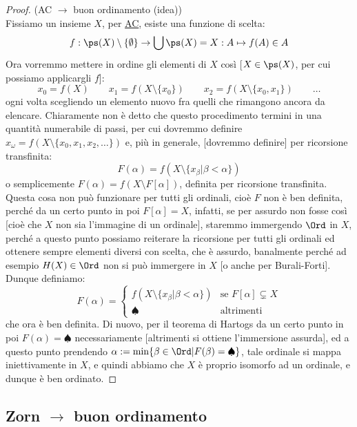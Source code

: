 \documentclass[11pt]{scrartcl}
\begin{document}
\begin{proof}
	(AC $\rightarrow$ buon ordinamento (idea))\\
	Fissiamo un insieme $X$, per \hyperref[ax9]{AC}, esiste una funzione di scelta:
	\[ f : \ps(X) \setminus\{\emptyset\} \rightarrow \bigcup \ps(X) = X : A \mapsto f(A) \in A
		\]
	Ora vorremmo mettere in ordine gli elementi di $X$ così [$X \in \ps(X)$, per cui possiamo applicargli $f$]:
	\[ x_0 = f(X) \qquad x_1 = f(X \setminus \{x_0\}) \qquad x_2 = f(X \setminus \{x_0,x_1\}) \qquad\ldots
		\]
	ogni volta scegliendo un elemento nuovo fra quelli che rimangono ancora da elencare. Chiaramente non è detto che questo procedimento termini
	in una quantità numerabile di passi, per cui dovremmo definire $x_\omega = f(X\setminus\{x_0,x_1,x_2,\ldots\})$ e, più in generale, [dovremmo definire] per ricorsione transfinita:
	\[ F(\alpha) = f(X \setminus\{x_\beta | \beta < \alpha\})
		\]
	o semplicemente $F(\alpha) = f(X \setminus F[\alpha])$, definita per ricorsione transfinita. Questa cosa non può funzionare per tutti gli ordinali, cioè $F$ non è ben definita, perché da un certo punto in poi $F[\alpha] = X$, infatti, se per assurdo non fosse così [cioè che $X$ non sia l'immagine di un ordinale],
	staremmo immergendo $\Ord$ in $X$, perché a questo punto possiamo reiterare la ricorsione per tutti gli ordinali ed ottenere sempre elementi diversi con scelta, che è assurdo, banalmente perché ad esempio $H(X) \in \Ord$ non si può immergere in $X$ [o anche per Burali-Forti]. Dunque definiamo:
	\[ F(\alpha) = \begin{cases}
		f(X \setminus\{x_\beta | \beta < \alpha\}) &\text{se $F[\alpha] \subsetneq X$} \\
		\spadesuit &\text{altrimenti}
	\end{cases}
		\] 
	che ora è ben definita. Di nuovo, per il teorema di Hartogs da un certo punto in poi $F(\alpha) = \spadesuit$ necessariamente [altrimenti si ottiene l'immersione assurda], ed a questo punto prendendo $\alpha := \min \{\beta \in \Ord | F(\beta) = \spadesuit\}$, tale ordinale si mappa iniettivamente in $X$, e quindi abbiamo che $X$
	è proprio isomorfo ad un ordinale, e dunque è ben ordinato.
\end{proof}

\subsection{\texorpdfstring{Zorn $\rightarrow$ buon ordinamento}{Zorn implica buon ordinamento}}
\end{document}
